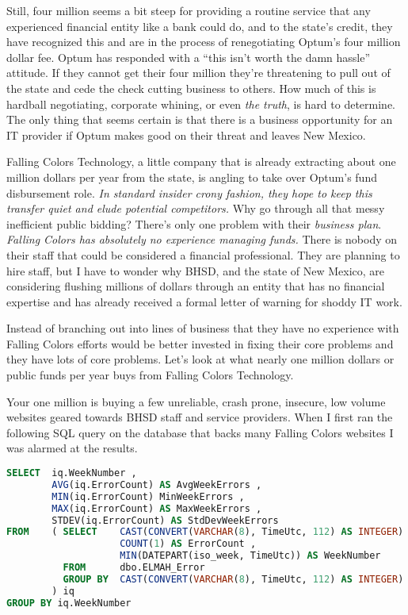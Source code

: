 Still, four million seems a bit steep for providing a routine service
that any experienced financial entity like a bank could do, and to the
state's credit, they have recognized this and are in the process of
renegotiating Optum's four million dollar fee. Optum has responded with
a ``this isn't worth the damn hassle'' attitude. If they cannot get
their four million they're threatening to pull out of the state and cede
the check cutting business to others. How much of this is hardball
negotiating, corporate whining, or even \emph{the truth}, is hard to
determine. The only thing that seems certain is that there is a business
opportunity for an IT provider if Optum makes good on their threat and
leaves New Mexico.

Falling Colors Technology, a little company that is already extracting
about one million dollars per year from the state, is angling to take
over Optum's fund disbursement role. \emph{In standard insider crony
fashion, they hope to keep this transfer quiet and elude potential
competitors.} Why go through all that messy inefficient public bidding?
There's only one problem with their \emph{business plan}. \emph{Falling
Colors has absolutely no experience managing funds.} There is nobody on
their staff that could be considered a financial professional. They are
planning to hire staff, but I have to wonder why BHSD, and the state of
New Mexico, are considering flushing millions of dollars through an
entity that has no financial expertise and has already received a formal
letter of warning for shoddy IT work.

Instead of branching out into lines of business that they have no
experience with Falling Colors efforts would be better invested in
fixing their core problems and they have lots of core problems. Let's
look at what nearly one million dollars or public funds per year buys
from Falling Colors Technology.

Your one million is buying a few unreliable, crash prone, insecure, low
volume websites geared towards BHSD staff and service providers. When I
first ran the following SQL query on the database that backs many
Falling Colors websites I was alarmed at the results.

\begin{lstlisting}[language=SQL,frame=single,framerule=0pt,label=lst:scr5261X0]
SELECT  iq.WeekNumber ,
        AVG(iq.ErrorCount) AS AvgWeekErrors ,
        MIN(iq.ErrorCount) MinWeekErrors ,
        MAX(iq.ErrorCount) AS MaxWeekErrors ,
        STDEV(iq.ErrorCount) AS StdDevWeekErrors
FROM    ( SELECT    CAST(CONVERT(VARCHAR(8), TimeUtc, 112) AS INTEGER) AS DayNumber ,
                    COUNT(1) AS ErrorCount ,
                    MIN(DATEPART(iso_week, TimeUtc)) AS WeekNumber
          FROM      dbo.ELMAH_Error
          GROUP BY  CAST(CONVERT(VARCHAR(8), TimeUtc, 112) AS INTEGER)
        ) iq
GROUP BY iq.WeekNumber
\end{lstlisting}

